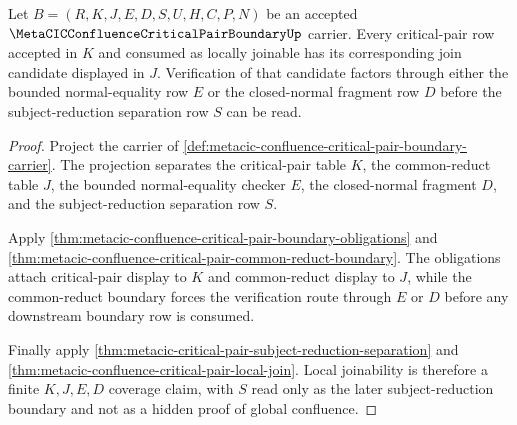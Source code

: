 \begin{theorem}
\label{thm:metacic-critical-pair-local-join-coverage}
Let $B=(R,K,J,E,D,S,U,H,C,P,N)$ be an accepted $\MetaCICConfluenceCriticalPairBoundaryUp$ carrier. Every critical-pair row accepted in $K$ and consumed as locally joinable has its corresponding join candidate displayed in $J$. Verification of that candidate factors through either the bounded normal-equality row $E$ or the closed-normal fragment row $D$ before the subject-reduction separation row $S$ can be read.
\end{theorem}
\begin{proof}
Project the carrier of \autoref{def:metacic-confluence-critical-pair-boundary-carrier}. The projection separates the critical-pair table $K$, the common-reduct table $J$, the bounded normal-equality checker $E$, the closed-normal fragment $D$, and the subject-reduction separation row $S$.

Apply \autoref{thm:metacic-confluence-critical-pair-boundary-obligations} and \autoref{thm:metacic-confluence-critical-pair-common-reduct-boundary}. The obligations attach critical-pair display to $K$ and common-reduct display to $J$, while the common-reduct boundary forces the verification route through $E$ or $D$ before any downstream boundary row is consumed.

Finally apply \autoref{thm:metacic-critical-pair-subject-reduction-separation} and \autoref{thm:metacic-confluence-critical-pair-local-join}. Local joinability is therefore a finite $K,J,E,D$ coverage claim, with $S$ read only as the later subject-reduction boundary and not as a hidden proof of global confluence.
\end{proof}

